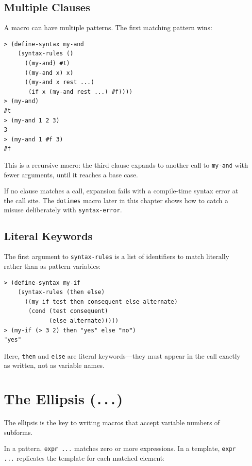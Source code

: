 \subsection{Multiple Clauses}

A macro can have multiple patterns. The first matching pattern wins:

\begin{lstlisting}[style=repl]
> (define-syntax my-and
    (syntax-rules ()
      ((my-and) #t)
      ((my-and x) x)
      ((my-and x rest ...)
       (if x (my-and rest ...) #f))))
> (my-and)
#t
> (my-and 1 2 3)
3
> (my-and 1 #f 3)
#f
\end{lstlisting}

This is a recursive macro: the third clause expands to another call to \texttt{my-and} with fewer arguments, until it reaches a base case.

If no clause matches a call, expansion fails with a compile-time syntax error at the call site. The \texttt{dotimes} macro later in this chapter shows how to catch a misuse deliberately with \texttt{syntax-error}.

\subsection{Literal Keywords}
\label{sec:literal-keywords}

The first argument to \texttt{syntax-rules} is a list of identifiers to match literally rather than as pattern variables:

\begin{lstlisting}[style=repl]
> (define-syntax my-if
    (syntax-rules (then else)
      ((my-if test then consequent else alternate)
       (cond (test consequent)
             (else alternate)))))
> (my-if (> 3 2) then "yes" else "no")
"yes"
\end{lstlisting}

Here, \texttt{then} and \texttt{else} are literal keywords---they must appear in the call exactly as written, not as variable names.

\section{The Ellipsis (\texttt{...})}

The ellipsis is the key to writing macros that accept variable numbers of subforms.

In a pattern, \texttt{expr ...} matches zero or more expressions. In a template, \texttt{expr ...} replicates the template for each matched element:

